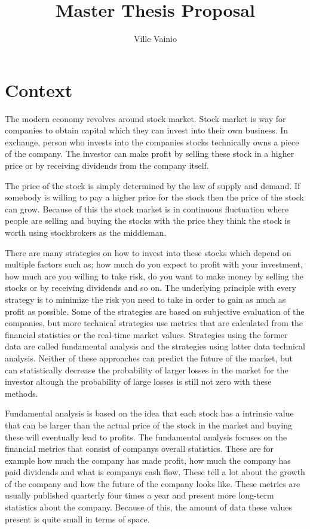\documentclass[article,11pt]{article}
\title{Master Thesis Proposal}
\begin{document}
\author{Ville Vainio}
\maketitle

\section{Context}

The modern economy revolves around stock market. 
Stock market is way for companies to obtain capital which they can invest into their own business. 
In exchange, person who invests into the companies stocks technically owns a piece of the company. 
The investor can make profit by selling these stock in a higher price or by receiving dividends from the company itself.

The price of the stock is simply determined by the law of supply and demand. 
If somebody is willing to pay a higher price for the stock then the price of the stock can grow. Because of this the stock market is in continuous fluctuation where people are selling and buying the stocks with the price they think the stock is worth using stockbrokers as the middleman. \cite{person}

There are many strategies on how to invest into these stocks which depend on multiple factors such as; how much do you expect to profit with your investment, how much are you willing to take risk, do you want to make money by selling the stocks or by receiving dividends and so on.
The underlying principle with every strategy is to minimize the risk you need to take in order to gain as much as profit as possible.
Some of the strategies are based on subjective evaluation of the companies, but more technical strategies use metrics that are calculated from the financial statistics or the real-time market values.
Strategies using the former data are called fundamental analysis and the strategies using latter data technical analysis.
Neither of these approaches can predict the future of the market, but can statistically decrease the probability of larger losses in the market for the investor altough the probability of large losses is still not zero with these methods. \cite{fox}

Fundamental analysis is based on the idea that each stock has a intrinsic value that can be larger than the actual price of the stock in the market and buying these will eventually lead to profits.\cite{sohnke}
The fundamental analysis focuses on the financial metrics that consist of companys overall statistics.
These are for example how much the company has made profit, how much the company has paid dividends and what is companys cash flow.
These tell a lot about the growth of the company and how the future of the company looks like.
These metrics are usually published quarterly four times a year and present more long-term statistics about the company.
Because of this, the amount of data these values present is quite small in terms of space.
\end{document}
